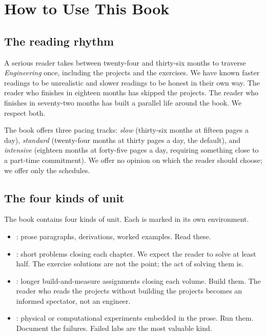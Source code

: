 \chapter*{How to Use This Book}
\label{frontmatter:how-to-use}

\section*{The reading rhythm}

A serious reader takes between twenty-four and thirty-six months to traverse \emph{Engineering} once, including the projects and the exercises. We have known faster readings to be unrealistic and slower readings to be honest in their own way. The reader who finishes in eighteen months has skipped the projects. The reader who finishes in seventy-two months has built a parallel life around the book. We respect both.

The book offers three pacing tracks: \emph{slow} (thirty-six months at fifteen pages a day), \emph{standard} (twenty-four months at thirty pages a day, the default), and \emph{intensive} (eighteen months at forty-five pages a day, requiring something close to a part-time commitment). We offer no opinion on which the reader should choose; we offer only the schedules.

\section*{The four kinds of unit}

The book contains four kinds of unit. Each is marked in its own environment.

\begin{itemize}
  \item {}: prose paragraphs, derivations, worked examples. Read these.
  \item {}: short problems closing each chapter. We expect the reader to solve at least half. The exercise solutions are not the point; the act of solving them is.
  \item {}: longer build-and-measure assignments closing each volume. Build them. The reader who reads the projects without building the projects becomes an informed spectator, not an engineer.
  \item {}: physical or computational experiments embedded in the prose. Run them. Document the failures. Failed labs are the most valuable kind.
\end{itemize}

